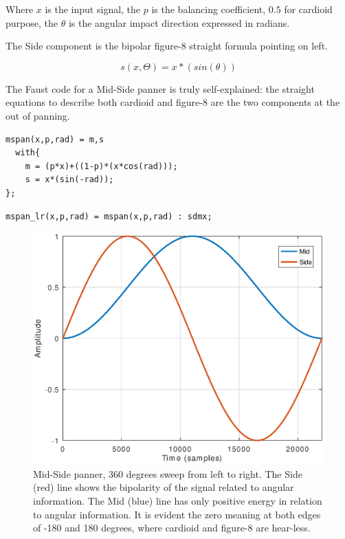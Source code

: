 \documentclass{article}
\begin{document}
Where $x$ is the input signal, the $p$ is the balancing coefficient, $0.5$ for cardioid purpose, the $\theta$ is the angular impact direction expressed in radians.

The Side component is the bipolar figure-8 straight formula pointing on left.

\begin{equation}
s(x,\Theta) = x*(sin(\theta))
\label{eq:mid}
\end{equation}

The Faust code for a Mid-Side panner is truly self-explained: the straight equations to describe both cardioid and figure-8 are the two components at the out of panning.

\begin{lstlisting}
mspan(x,p,rad) = m,s
  with{
    m = (p*x)+((1-p)*(x*cos(rad)));
    s = x*(sin(-rad));
};
\end{lstlisting}

\begin{lstlisting}
mspan_lr(x,p,rad) = mspan(x,p,rad) : sdmx;
\end{lstlisting}

\begin{figure}[h]
\centering
\includegraphics[width=1\columnwidth]{mspan}
\caption{Mid-Side panner, 360 degrees sweep from left to right. The Side (red) line shows the bipolarity of the signal related to angular information. The Mid (blue) line has only positive energy in relation to angular information. It is evident the zero meaning at both edges of -180 and 180 degrees, where cardioid and figure-8 are hear-less.}
\label{fig:mspan}
\end{figure}
\end{document}
